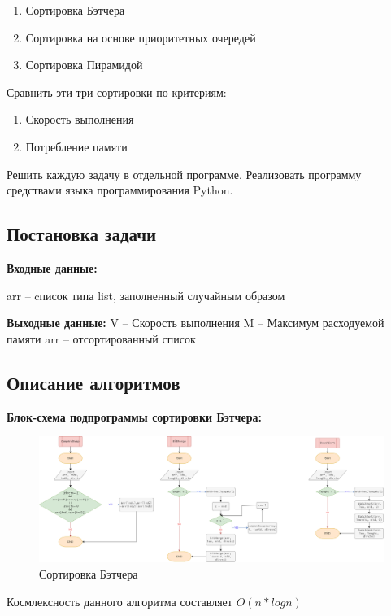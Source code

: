 \begin{enumerate}
    \item Сортировка Бэтчера
    \item Сортировка на основе приоритетных очередей
    \item Сортировка Пирамидой
\end{enumerate}

Сравнить эти три сортировки по критериям:

\begin{enumerate}
    \item Скорость выполнения
    \item Потребление памяти
\end{enumerate}

Решить каждую задачу в отдельной программе. Реализовать программу средствами языка программирования Python.

\subsection{Постановка задачи}

\textbf{Входные данные:}

arr – cписок типа list, заполненный случайным образом

\textbf{Выходные данные:}
V – Скорость выполнения
M – Максимум расходуемой памяти
arr – отсортированный список


\subsection{Описание алгоритмов}

\textbf{Блок-схема подпрограммы сортировки Бэтчера:}



\begin{figure}[H]
    \centering
    \includegraphics[width=1\textwidth]{./flowcharts/barcher.drawio.png}
    \caption{Сортировка Бэтчера}
\end{figure}

Космлексность данного алгоритма составляет $O(n * log{n})$


